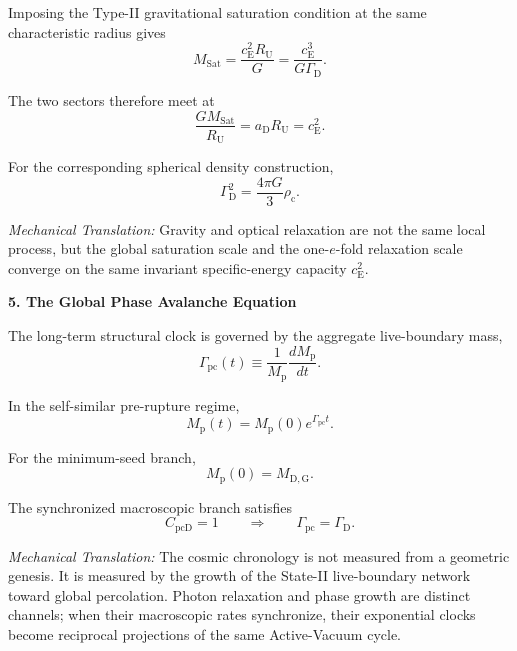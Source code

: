 Imposing the Type-II gravitational saturation condition at the same characteristic radius gives
\begin{equation}
    M_{\mathrm{Sat}} = \frac{c_{\mathrm E}^2 R_{\mathrm U}}{G} = \frac{c_{\mathrm E}^3}{G\Gamma_{\mathrm D}}.
\end{equation}

The two sectors therefore meet at
\begin{equation}
    \frac{GM_{\mathrm{Sat}}}{R_{\mathrm U}} = a_{\mathrm D}R_{\mathrm U} = c_{\mathrm E}^2.
\end{equation}

For the corresponding spherical density construction,
\begin{equation}
    \Gamma_{\mathrm D}^2 = \frac{4\pi G}{3}\rho_{\mathrm c}.
\end{equation}

\textit{Mechanical Translation:} Gravity and optical relaxation are not the same local process, but the global saturation scale and the one-$e$-fold relaxation scale converge on the same invariant specific-energy capacity $c_{\mathrm E}^2$.

\vspace{0.5em}

\noindent\textbf{5. The Global Phase Avalanche Equation}

The long-term structural clock is governed by the aggregate live-boundary mass,
\begin{equation}
    \Gamma_{\mathrm{pc}}(t) \equiv \frac{1}{M_{\mathrm p}} \frac{dM_{\mathrm p}}{dt}.
\end{equation}

In the self-similar pre-rupture regime,
\begin{equation}
    M_{\mathrm p}(t) = M_{\mathrm p}(0) e^{\Gamma_{\mathrm{pc}}t}.
\end{equation}

For the minimum-seed branch,
\begin{equation}
    M_{\mathrm p}(0) = M_{\mathrm{D,G}}.
\end{equation}

The synchronized macroscopic branch satisfies
\begin{equation}
    C_{\mathrm{pcD}} = 1 \qquad\Longrightarrow\qquad \Gamma_{\mathrm{pc}} = \Gamma_{\mathrm D}.
\end{equation}

\textit{Mechanical Translation:} The cosmic chronology is not measured from a geometric genesis. It is measured by the growth of the State-II live-boundary network toward global percolation. Photon relaxation and phase growth are distinct channels; when their macroscopic rates synchronize, their exponential clocks become reciprocal projections of the same Active-Vacuum cycle.


